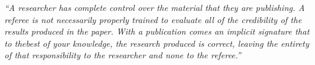 \documentclass[12pt]{beamer}
\newcommand\ans[1]{{\it ``#1''}}
\begin{document}
\begin{frame}
  
\ans{A researcher has complete control over the material that they are publishing.  A referee is not necessarily properly trained to evaluate all of the credibility of the results produced  in  the  paper.   With  a  publication  comes  an  implicit  signature  that  to  thebest of your knowledge, the research produced is correct, leaving the entirety of that responsibility to the researcher and none to the referee.}














\end{frame}
\end{document}
